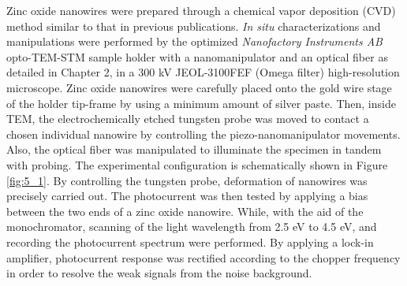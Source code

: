 Zinc oxide nanowires were prepared through a chemical vapor deposition (CVD) method similar to that in previous publications.\cite{D.2015}
{\em In situ} characterizations and manipulations were performed by the optimized {\em Nanofactory Instruments AB} opto-TEM-STM sample holder with a nanomanipulator and an optical fiber as detailed in Chapter 2, in a 300 kV JEOL-3100FEF (Omega filter) high-resolution microscope. 
Zinc oxide nanowires were carefully placed onto the gold wire stage of the holder tip-frame by using a minimum amount of silver paste. 
Then, inside TEM, the electrochemically etched tungsten probe was moved to contact a chosen individual nanowire by controlling the piezo-nanomanipulator movements. Also, the optical fiber was manipulated to illuminate the specimen in tandem with probing. 
The experimental configuration is schematically shown in Figure \ref{fig:5_1}. 
By controlling the tungsten probe, deformation of nanowires was precisely carried out. 
The photocurrent was then tested by applying a bias between the two ends of a zinc oxide nanowire. While, with the aid of the monochromator, scanning of the light wavelength from 2.5 eV to 4.5 eV, and recording the photocurrent spectrum were performed. 
By applying a lock-in amplifier, photocurrent response was rectified according to the chopper frequency in order to resolve the weak signals from the noise background. 

